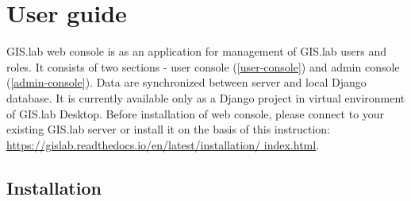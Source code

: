 \chapter{User guide}
\label{user-guide}

GIS.lab web console is as an application for management of GIS.lab
users and roles. It consists of two sections - user console
(\ref{user-console}) and admin console (\ref{admin-console}). Data are
synchronized between  server and local Django database. It is
currently available only as a Django project in virtual environment of
GIS.lab Desktop. Before installation of web console, please connect to
your existing GIS.lab server or install it on the basis of this
instruction:
\href{https://gislab.readthedocs.io/en/latest/installation/index.html}{https://gislab.readthedocs.io/en/latest/installation/\linebreak
  index.html}.

\section{Installation}
\label{installation}

